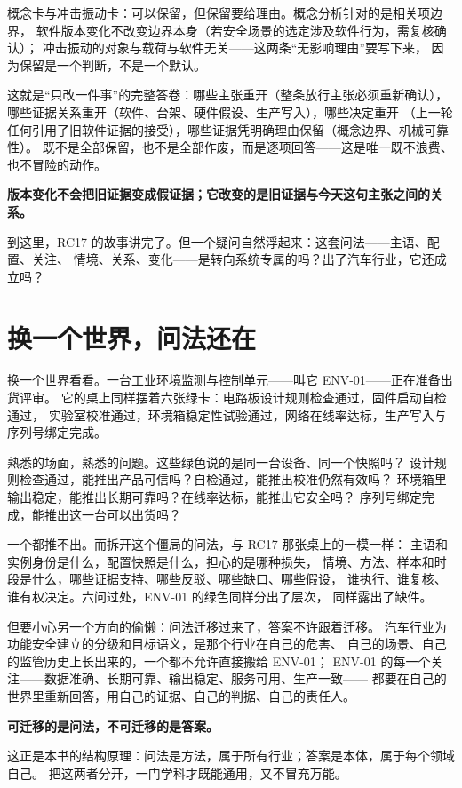 概念卡与冲击振动卡：可以保留，但保留要给理由。概念分析针对的是相关项边界，
软件版本变化不改变边界本身（若安全场景的选定涉及软件行为，需复核确认）；
冲击振动的对象与载荷与软件无关——这两条“无影响理由”要写下来，
因为保留是一个判断，不是一个默认。

这就是“只改一件事”的完整答卷：哪些主张重开（整条放行主张必须重新确认），
哪些证据关系重开（软件、台架、硬件假设、生产写入），哪些决定重开
（上一轮任何引用了旧软件证据的接受），哪些证据凭明确理由保留（概念边界、机械可靠性）。
既不是全部保留，也不是全部作废，而是逐项回答——这是唯一既不浪费、也不冒险的动作。

\textbf{版本变化不会把旧证据变成假证据；它改变的是旧证据与今天这句主张之间的关系。}

到这里，RC17 的故事讲完了。但一个疑问自然浮起来：这套问法——主语、配置、关注、
情境、关系、变化——是转向系统专属的吗？出了汽车行业，它还成立吗？

\section{换一个世界，问法还在}

换一个世界看看。一台工业环境监测与控制单元——叫它 ENV-01——正在准备出货评审。
它的桌上同样摆着六张绿卡：电路板设计规则检查通过，固件启动自检通过，
实验室校准通过，环境箱稳定性试验通过，网络在线率达标，生产写入与序列号绑定完成。

熟悉的场面，熟悉的问题。这些绿色说的是同一台设备、同一个快照吗？
设计规则检查通过，能推出产品可信吗？自检通过，能推出校准仍然有效吗？
环境箱里输出稳定，能推出长期可靠吗？在线率达标，能推出它安全吗？
序列号绑定完成，能推出这一台可以出货吗？

一个都推不出。而拆开这个僵局的问法，与 RC17 那张桌上的一模一样：
主语和实例身份是什么，配置快照是什么，担心的是哪种损失，
情境、方法、样本和时段是什么，哪些证据支持、哪些反驳、哪些缺口、哪些假设，
谁执行、谁复核、谁有权决定。六问过处，ENV-01 的绿色同样分出了层次，
同样露出了缺件。

但要小心另一个方向的偷懒：问法迁移过来了，答案不许跟着迁移。
汽车行业为功能安全建立的分级和目标语义，是那个行业在自己的危害、
自己的场景、自己的监管历史上长出来的，一个都不允许直接搬给 ENV-01；
ENV-01 的每一个关注——数据准确、长期可靠、输出稳定、服务可用、生产一致——
都要在自己的世界里重新回答，用自己的证据、自己的判据、自己的责任人。

\textbf{可迁移的是问法，不可迁移的是答案。}

这正是本书的结构原理：问法是方法，属于所有行业；答案是本体，属于每个领域自己。
把这两者分开，一门学科才既能通用，又不冒充万能。

